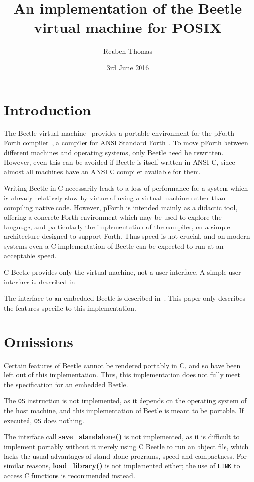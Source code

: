 \documentclass{article}
\title{An implementation of the Beetle virtual machine for POSIX}
\author{Reuben Thomas}
\date{3rd June 2016}
\begin{document}
\maketitle


\section{Introduction}

The Beetle virtual machine~\cite{beetle} provides a portable environment
for the pForth Forth compiler~\cite{beetledis}, a compiler for ANSI Standard
Forth~\cite{ANSIforth}. To move pForth between different machines and
operating systems, only Beetle need be rewritten. However, even this can be
avoided if Beetle is itself written in ANSI C, since almost all machines have
an ANSI C compiler available for them.

Writing Beetle in C necessarily leads to a loss of performance for a system
which is already relatively slow by virtue of using a virtual machine
rather than compiling native code. However, pForth is intended mainly as a
didactic tool, offering a concrete Forth environment which may be used to
explore the language, and particularly the implementation of the compiler, on
a simple architecture designed to support Forth. Thus speed is not crucial,
and on modern systems even a C implementation of Beetle can be expected to
run at an acceptable speed.

C Beetle provides only the virtual machine, not a user interface. A simple
user interface is described in~\cite{beetleuiface}.

The interface to an embedded Beetle is described in~\cite{beetle}. This paper
only describes the features specific to this implementation.


\section{Omissions}
\label{omissions}

Certain features of Beetle cannot be rendered portably in C, and so have been
left out of this implementation. Thus, this implementation does not fully
meet the specification for an embedded Beetle.

The {\tt OS} instruction is not implemented, as it depends on the operating
system of the host machine, and this implementation of Beetle is meant to be
portable. If executed, {\tt OS} does nothing.

The interface call {\bf save\_standalone()} is not implemented, as it is
difficult to implement portably without it merely using C Beetle to run an
object file, which lacks the usual advantages of stand-alone programs, speed
and compactness. For similar reasons, {\bf load\_library()} is not
implemented either; the use of {\tt LINK} to access C functions is
recommended instead.
\end{document}
